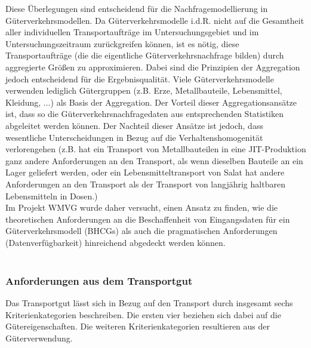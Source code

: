 Diese Überlegungen sind entscheidend für die Nachfragemodellierung in Güterverkehrsmodellen. Da Güterverkehrsmodelle i.d.R. nicht auf die Gesamtheit aller individuellen Transportaufträge im Untersuchungsgebiet und im Untersuchungszeitraum zurückgreifen können, ist es nötig, diese Transportaufträge (die die eigentliche Güterverkehrsnachfrage bilden) durch aggregierte Größen zu approximieren. Dabei sind die Prinzipien der Aggregation jedoch entscheidend für die Ergebnisqualität. Viele Güterverkehrsmodelle verwenden lediglich Gütergruppen (z.B. Erze, Metallbauteile, Lebensmittel, Kleidung, $\ldots$) als Basis der Aggregation. Der Vorteil dieser Aggregationsansätze ist, dass so die Güterverkehrsnachfragedaten aus entsprechenden Statistiken abgeleitet werden können. Der Nachteil dieser Ansätze ist jedoch, dass wesentliche Unterscheidungen in Bezug auf die Verhaltenshomogenität verlorengehen (z.B. hat ein Transport von Metallbauteilen in eine JIT-Produktion ganz andere Anforderungen an den Transport, als wenn dieselben Bauteile an ein Lager geliefert werden, oder ein Lebensmitteltransport von Salat hat andere Anforderungen an den Transport als der Transport von langjährig haltbaren Lebensmitteln in Dosen.)~\\
Im Projekt WMVG wurde daher versucht, einen Ansatz zu finden, wie die theoretischen Anforderungen an die Beschaffenheit von Eingangsdaten für ein Güterverkehrsmodell (BHCGs) als auch die pragmatischen Anforderungen (Datenverfügbarkeit) hinreichend abgedeckt werden können.~\\

\label{_Toc366766109}
\newpage
~\\


% 
\subsubsection{Anforderungen aus dem Transportgut}
\label{_Toc366775303}
Das Transportgut lässt sich in Bezug auf den Transport durch insgesamt sechs Kriterienkategorien beschreiben. Die ersten vier beziehen sich dabei auf die Gütereigenschaften. Die weiteren Kriterienkategorien resultieren aus der Güterverwendung.~\\

